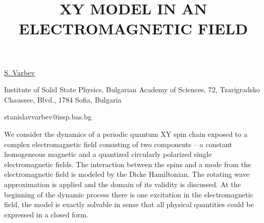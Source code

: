 \title{XY MODEL IN AN ELECTROMAGNETIC FIELD}

\underline{S. Varbev} 

{\normalsize{\vspace{-4mm}
Institute of Solid State Physics, Bulgarian Academy of Sciences,
72, Tzarigradsko Chaussee, Blvd., 1784 Sofia, Bulgaria



\email stanislavvarbev@issp.bas.bg}}

We consider the dynamics of a periodic quantum XY spin chain exposed to a complex
electromagnetic field consisting of two components – a constant homogeneous magnetic and a quantized circularly polarized single electromagnetic fields. The interaction between the spins and a mode from the electromagnetic field is modeled by the Dicke Hamiltonian. The rotating wave approximation is applied and the domain of its validity is discussed. At the beginning of the dynamic process there is one excitation in the electromagnetic field, the model is exactly solvable in sense that all physical quantities could be expressed in a closed form.

\vspace{\baselineskip}